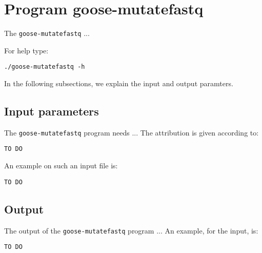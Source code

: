 \section{Program goose-mutatefastq}
The \texttt{goose-mutatefastq} ...

For help type:
\begin{lstlisting}
./goose-mutatefastq -h
\end{lstlisting}
In the following subsections, we explain the input and output paramters.

\subsection*{Input parameters}

The \texttt{goose-mutatefastq} program needs ...
The attribution is given according to:
\begin{lstlisting}
TO DO
\end{lstlisting}

An example on such an input file is:
\begin{lstlisting}
TO DO
\end{lstlisting}

\subsection*{Output}
The output of the \texttt{goose-mutatefastq} program ...
An example, for the input, is:
\begin{lstlisting}
TO DO
\end{lstlisting}
